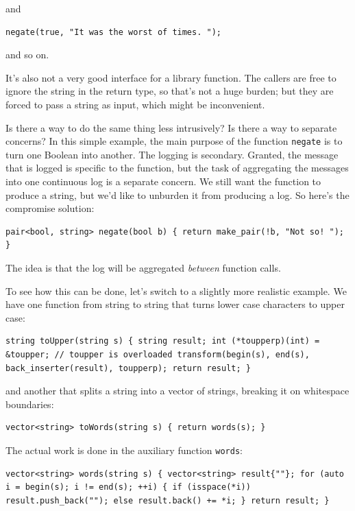and

\begin{verbatim}
negate(true, "It was the worst of times. ");
\end{verbatim}

and so on.

It's also not a very good interface for a library function. The callers
are free to ignore the string in the return type, so that's not a huge
burden; but they are forced to pass a string as input, which might be
inconvenient.

Is there a way to do the same thing less intrusively? Is there a way to
separate concerns? In this simple example, the main purpose of the
function \texttt{negate} is to turn one Boolean into another. The
logging is secondary. Granted, the message that is logged is specific to
the function, but the task of aggregating the messages into one
continuous log is a separate concern. We still want the function to
produce a string, but we'd like to unburden it from producing a log. So
here's the compromise solution:

\begin{verbatim}
pair<bool, string> negate(bool b) { return make_pair(!b, "Not so! "); }
\end{verbatim}

The idea is that the log will be aggregated \emph{between} function
calls.

To see how this can be done, let's switch to a slightly more realistic
example. We have one function from string to string that turns lower
case characters to upper case:

\begin{verbatim}
string toUpper(string s) { string result; int (*toupperp)(int) = &toupper; // toupper is overloaded transform(begin(s), end(s), back_inserter(result), toupperp); return result; }
\end{verbatim}

and another that splits a string into a vector of strings, breaking it
on whitespace boundaries:

\begin{verbatim}
vector<string> toWords(string s) { return words(s); }
\end{verbatim}

The actual work is done in the auxiliary function \texttt{words}:

\begin{verbatim}
vector<string> words(string s) { vector<string> result{""}; for (auto i = begin(s); i != end(s); ++i) { if (isspace(*i)) result.push_back(""); else result.back() += *i; } return result; }
\end{verbatim}

